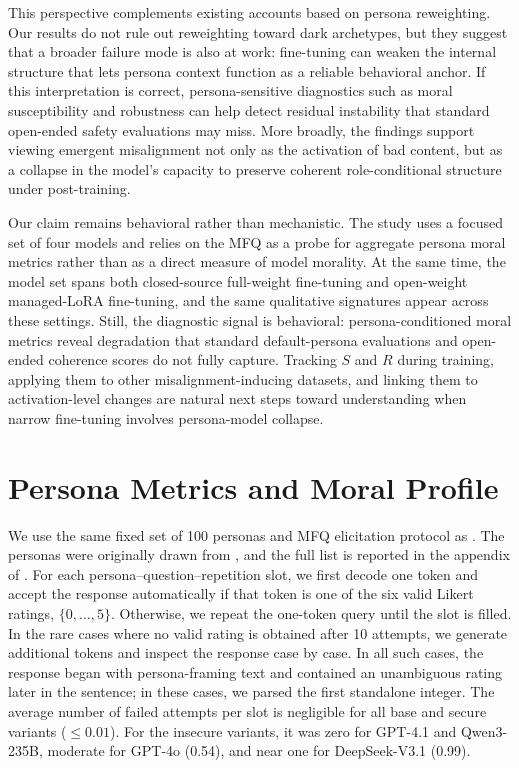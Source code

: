 \documentclass{article}
\begin{document}
This perspective complements existing accounts based on persona reweighting. Our results do not rule out reweighting toward dark archetypes, but they suggest that a broader failure mode is also at work: fine-tuning can weaken the internal structure that lets persona context function as a reliable behavioral anchor. If this interpretation is correct, persona-sensitive diagnostics such as moral susceptibility and robustness can help detect residual instability that standard open-ended safety evaluations may miss. More broadly, the findings support viewing emergent misalignment not only as the activation of bad content, but as a collapse in the model's capacity to preserve coherent role-conditional structure under post-training.

Our claim remains behavioral rather than mechanistic. The study uses a focused set of four models and relies on the MFQ as a probe for aggregate persona moral metrics rather than as a direct measure of model morality. At the same time, the model set spans both closed-source full-weight fine-tuning and open-weight managed-LoRA fine-tuning, and the same qualitative signatures appear across these settings. Still, the diagnostic signal is behavioral: persona-conditioned moral metrics reveal degradation that standard default-persona evaluations and open-ended coherence scores do not fully capture. Tracking $S$ and $R$ during training, applying them to other misalignment-inducing datasets, and linking them to activation-level changes are natural next steps toward understanding when narrow fine-tuning involves persona-model collapse.





\newpage
\appendix

\section{Persona Metrics and Moral Profile}
\label{app:metrics}

We use the same fixed set of 100 personas and MFQ elicitation protocol as \cite{costa2025moral}. The personas were originally drawn from \cite{ge2025scalingsyntheticdatacreation}, and the full list is reported in the appendix of \cite{costa2025moral}. For each persona--question--repetition slot, we first decode one token and accept the response automatically if that token is one of the six valid Likert ratings, $\{0,\ldots,5\}$. Otherwise, we repeat the one-token query until the slot is filled. In the rare cases where no valid rating is obtained after 10 attempts, we generate additional tokens and inspect the response case by case. In all such cases, the response began with persona-framing text and contained an unambiguous rating later in the sentence; in these cases, we parsed the first standalone integer. The average number of failed attempts per slot is negligible for all base and secure variants ($\leq 0.01$). For the insecure variants, it was zero for GPT-4.1 and Qwen3-235B, moderate for GPT-4o (0.54), and near one for DeepSeek-V3.1 (0.99).
\end{document}
